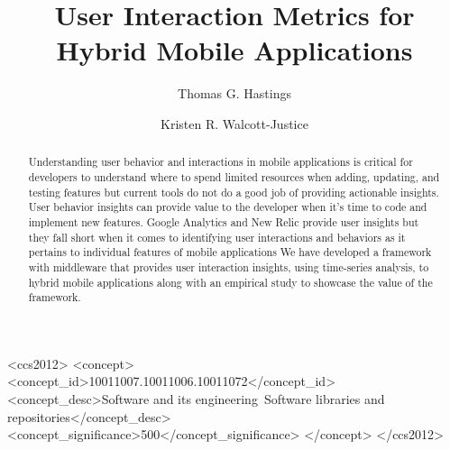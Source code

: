 \documentclass[sigconf]{acmart}
\begin{document}
\title{User Interaction Metrics for Hybrid Mobile Applications}


\author{Thomas G. Hastings}

\author{Kristen R. Walcott-Justice}

\begin{abstract}
Understanding user behavior and interactions in mobile applications is critical for developers to understand where to spend limited resources when adding, updating, and testing features but current tools do not do a good job of providing actionable insights. User behavior insights can provide value to the developer when it's time to code and implement new features. Google Analytics and New Relic provide user insights but they fall short when it comes to identifying user interactions and behaviors as it pertains to individual features of mobile applications We have developed a framework with middleware that provides user interaction insights, using time-series analysis, to hybrid mobile applications along with an empirical study to showcase the value of the framework. 
\end{abstract}

%
%
\begin{CCSXML}

<ccs2012>
<concept>
<concept_id>10011007.10011006.10011072</concept_id>
 <concept_desc>Software and its engineering~Software libraries and repositories</concept_desc>
<concept_significance>500</concept_significance>
</concept>
</ccs2012>

\end{CCSXML}





\maketitle




 
\end{document}
